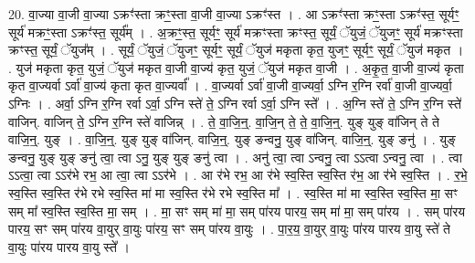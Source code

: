 \documentclass[17pt]{extarticle}
\begin{document}
20. वा॒ज्या वा॒जी वा॒ज्या ऽक्रꣳ॑स्ता क्रꣳ॒॒स्ता वा॒जी वा॒ज्या ऽक्रꣳ॑स्त । . आ ऽक्रꣳ॑स्ता क्रꣳ॒॒स्ता ऽक्रꣳ॑स्त॒ सूर्यꣳ॒॒ सूर्य॑ मक्रꣳ॒॒स्ता ऽक्रꣳ॑स्त॒ सूर्य᳚म् । . अ॒क्रꣳ॒॒स्त॒ सूर्यꣳ॒॒ सूर्य॑ मक्रꣳस्ता क्रꣳस्त॒ सूर्यं॒ ॅयुजं॒ ॅयुजꣳ॒॒ सूर्य॑ मक्रꣳस्ता क्रꣳस्त॒ सूर्यं॒ ॅयुज᳚म् । . सूर्यं॒ ॅयुजं॒ ॅयुजꣳ॒॒ सूर्यꣳ॒॒ सूर्यं॒ ॅयुज॑ मकृता कृत॒ युजꣳ॒॒ सूर्यꣳ॒॒ सूर्यं॒ ॅयुज॑ मकृत । . युज॑ मकृता कृत॒ युजं॒ ॅयुज॑ मकृत वा॒जी वा॒ज्य॑ कृत॒ युजं॒ ॅयुज॑ मकृत वा॒जी । . अ॒कृ॒त॒ वा॒जी वा॒ज्य॑ कृता कृत वा॒ज्यर्वा ऽर्वा॑ वा॒ज्य॑ कृता कृत वा॒ज्यर्वा᳚ । . वा॒ज्यर्वा ऽर्वा॑ वा॒जी वा॒ज्यर्वा॒ ऽग्नि र॒ग्नि रर्वा॑ वा॒जी वा॒ज्यर्वा॒ ऽग्निः । . अर्वा॒ ऽग्नि र॒ग्नि रर्वा ऽर्वा॒ ऽग्नि स्ते॑ ते॒ ऽग्नि रर्वा ऽर्वा॒ ऽग्नि स्ते᳚ । . अ॒ग्नि स्ते॑ ते॒ ऽग्नि र॒ग्नि स्ते॑ वाजिन्. वाजिन् ते॒ ऽग्नि र॒ग्नि स्ते॑ वाजिन्न् । . ते॒ वा॒जि॒न्॒. वा॒जि॒न् ते॒ ते॒ वा॒जि॒न्॒. युङ् युङ् वा॑जिन् ते ते वाजि॒न्॒. युङ् । . वा॒जि॒न्॒. युङ् युङ् वा॑जिन्. वाजि॒न्॒. युङ् ङन्वनु॒ युङ् वा॑जिन्. वाजि॒न्॒. युङ् ङनु॑ । . युङ् ङन्वनु॒ युङ् युङ् ङनु॑ त्वा॒ त्वा ऽनु॒ युङ् युङ् ङनु॑ त्वा । . अनु॑ त्वा॒ त्वा ऽन्वनु॒ त्वा ऽऽत्वा ऽन्वनु॒ त्वा । . त्वा ऽऽत्वा॒ त्वा ऽऽर॑भे रभ॒ आ त्वा॒ त्वा ऽऽर॑भे । . आ र॑भे रभ॒ आ र॑भे स्व॒स्ति स्व॒स्ति र॑भ॒ आ र॑भे स्व॒स्ति । . र॒भे॒ स्व॒स्ति स्व॒स्ति र॑भे रभे स्व॒स्ति मा॑ मा स्व॒स्ति र॑भे रभे स्व॒स्ति मा᳚ । . स्व॒स्ति मा॑ मा स्व॒स्ति स्व॒स्ति मा॒ सꣳ सम् मा᳚ स्व॒स्ति स्व॒स्ति मा॒ सम् । . मा॒ सꣳ सम् मा॑ मा॒ सम् पा॑रय पारय॒ सम् मा॑ मा॒ सम् पा॑रय । . सम् पा॑रय पारय॒ सꣳ सम् पा॑रय वा॒युर् वा॒युः पा॑रय॒ सꣳ सम् पा॑रय वा॒युः । . पा॒र॒य॒ वा॒युर् वा॒युः पा॑रय पारय वा॒यु स्ते॑ ते वा॒युः पा॑रय पारय वा॒यु स्ते᳚ । \newline
\end{document}
